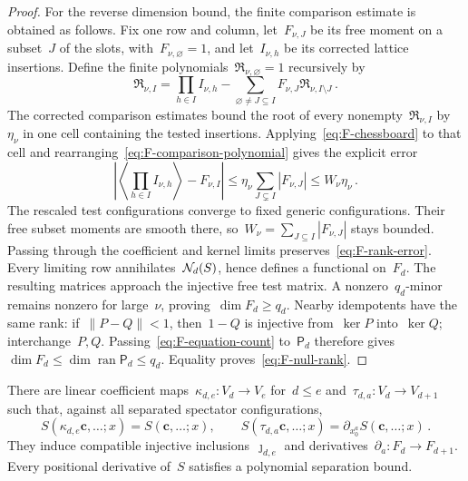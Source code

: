 \begin{proof}
For the reverse dimension bound, the finite comparison estimate is obtained as follows. Fix one row and column, let~$F_{\nu,J}$ be its free moment on a subset~$J$ of the slots, with~$F_{\nu,\varnothing}=1$, and let~$I_{\nu,h}$ be its corrected lattice insertions. Define the finite polynomials~$\mathfrak R_{\nu,\varnothing}=1$ recursively by
\begin{equation}\label{eq:F-comparison-polynomial}
\mathfrak R_{\nu,I}=\prod_{h\in I}I_{\nu,h}-\sum_{\varnothing\ne J\subseteq I}F_{\nu,J}\mathfrak R_{\nu,I\setminus J}\,.
\end{equation}
The corrected comparison estimates bound the root of every nonempty~$\mathfrak R_{\nu,I}$ by~$\eta_\nu$ in one cell containing the tested insertions. Applying~\eqref{eq:F-chessboard} to that cell and rearranging~\eqref{eq:F-comparison-polynomial} gives the explicit error
\begin{equation}\label{eq:F-rank-error}
\left|\left\langle\prod_{h\in I}I_{\nu,h}\right\rangle-F_{\nu,I}\right|
\le\eta_\nu\sum_{J\subsetneq I}|F_{\nu,J}|\le W_\nu\eta_\nu\,.
\end{equation}
The rescaled test configurations converge to fixed generic configurations. Their free subset moments are smooth there, so~$W_\nu=\sum_{J\subseteq I}|F_{\nu,J}|$ stays bounded. Passing through the coefficient and kernel limits preserves~\eqref{eq:F-rank-error}. Every limiting row annihilates~$\mathcal{N}_{d}(S)$, hence defines a functional on~$F_d$. The resulting matrices approach the injective free test matrix. A nonzero~$q_d$-minor remains nonzero for large~$\nu$, proving~$\dim F_d\ge q_d$. Nearby idempotents have the same rank: if~$\|P-Q\|<1$, then~$1-Q$ is injective from~$\ker P$ into~$\ker Q$; interchange~$P,Q$. Passing~\eqref{eq:F-equation-count} to~$\mathsf P_d$ therefore gives~$\dim F_d\le\dim\operatorname{ran}\mathsf P_d\le q_d$. Equality proves~\eqref{eq:F-null-rank}.
\end{proof}

\begin{lemma}\label{lem:F-calculus}
There are linear coefficient maps~$\kappa_{d,e}:V_d\to V_e$ for~$d\le e$ and~$\tau_{d,a}:V_d\to V_{d+1}$ such that, against all separated spectator configurations,
\begin{equation}\label{eq:F-label-identities}
S(\kappa_{d,e}\mathbf c,\ldots;x)=S(\mathbf c,\ldots;x),\qquad S(\tau_{d,a}\mathbf c,\ldots;x)=\partial_{x_0^a}S(\mathbf c,\ldots;x)\,.
\end{equation}
They induce compatible injective inclusions~$\jmath_{d,e}$ and derivatives~$\partial_a:F_d\to F_{d+1}$. Every positional derivative of~$S$ satisfies a polynomial separation bound.
\end{lemma}

